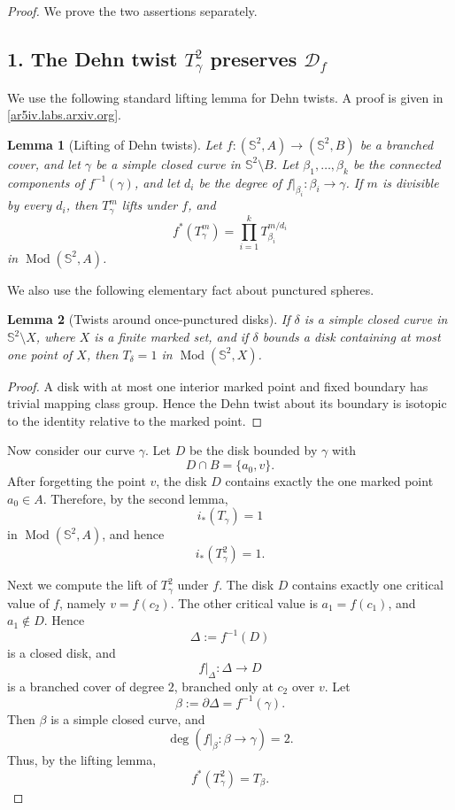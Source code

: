 \documentclass[11pt]{article}
\newtheorem{lemma}{Lemma}
\theoremstyle{remark}
\DeclareMathOperator{\Mod}{Mod}
\begin{document}
\begin{proof}
We prove the two assertions separately.

\subsection*{1. The Dehn twist \(T_\gamma^2\) preserves \(\mathcal D_f\)}

We use the following standard lifting lemma for Dehn twists. A proof is given in
\href{https://ar5iv.labs.arxiv.org/html/1606.00723}{[ar5iv.labs.arxiv.org]}.

\begin{lemma}[Lifting of Dehn twists]
Let \(f:(\mathbb{S}^2,A)\to(\mathbb{S}^2,B)\) be a branched cover, and let
\(\gamma\) be a simple closed curve in \(\mathbb{S}^2\setminus B\). Let
\(\beta_1,\dots,\beta_k\) be the connected components of \(f^{-1}(\gamma)\), and let
\(d_i\) be the degree of \(f|_{\beta_i}:\beta_i\to\gamma\). If \(m\) is divisible by every
\(d_i\), then \(T_\gamma^m\) lifts under \(f\), and
\[
f^*(T_\gamma^m)=\prod_{i=1}^k T_{\beta_i}^{m/d_i}
\]
in \(\Mod(\mathbb{S}^2,A)\).
\end{lemma}

We also use the following elementary fact about punctured spheres.

\begin{lemma}[Twists around once-punctured disks]
If \(\delta\) is a simple closed curve in \(\mathbb{S}^2\setminus X\), where \(X\) is a finite
marked set, and if \(\delta\) bounds a disk containing at most one point of \(X\), then
\(T_\delta=1\) in \(\Mod(\mathbb{S}^2,X)\).
\end{lemma}

\begin{proof}
A disk with at most one interior marked point and fixed boundary has trivial mapping class
group. Hence the Dehn twist about its boundary is isotopic to the identity relative to the
marked point.
\end{proof}

Now consider our curve \(\gamma\). Let \(D\) be the disk bounded by \(\gamma\) with
\[
D\cap B=\{a_0,v\}.
\]
After forgetting the point \(v\), the disk \(D\) contains exactly the one marked point
\(a_0\in A\). Therefore, by the second lemma,
\[
i_*(T_\gamma)=1
\]
in \(\Mod(\mathbb{S}^2,A)\), and hence
\begin{equation}
i_*(T_\gamma^2)=1. \label{eq:forgetful}
\end{equation}

Next we compute the lift of \(T_\gamma^2\) under \(f\). The disk \(D\) contains exactly one
critical value of \(f\), namely \(v=f(c_2)\). The other critical value is
\(a_1=f(c_1)\), and \(a_1\notin D\). Hence
\[
\Delta:=f^{-1}(D)
\]
is a closed disk, and
\[
f|_{\Delta}:\Delta\to D
\]
is a branched cover of degree \(2\), branched only at \(c_2\) over \(v\). Let
\[
\beta:=\partial\Delta=f^{-1}(\gamma).
\]
Then \(\beta\) is a simple closed curve, and
\[
\deg(f|_{\beta}:\beta\to\gamma)=2.
\]
Thus, by the lifting lemma,
\begin{equation}
f^*(T_\gamma^2)=T_\beta. \label{eq:lift}
\end{equation}


\end{proof}
\end{document}
